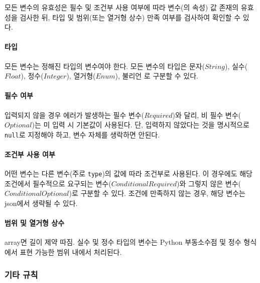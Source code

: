 \newcommand{\jsontable}[2]{
  \begin{table}[htbp]
    \centering
    \caption{grjson 구조에서 \texttt{#1} 클래스의 속성들}
    {\footnotesize
    \begin{tabularx}{\textwidth}{l c c c Y Y c}
      \toprule
      변수명 & 타입 & 필수 & 기본값 & 조건 & 범위/길이/선택지 & 단위 \\
      \midrule
      #2
      \bottomrule
    \end{tabularx}
   } 
  \end{table}
}

모든 변수의 유효성은 필수 및 조건부 사용 여부에 따라 변수(의 속성) 값 존재의 유효성을 검사한 뒤, 타입 및 범위(또는 열거형 상수) 만족 여부를 검사하여 확인할 수 있다.

\paragraph{타입} 모든 변수는 정해진 타입의 변수여야 한다. 모든 변수의 타입은 문자($String$), 실수($Float$), 정수($Integer$), 열거형($Enum$), 불리언 로 구분할 수 있다. 

\paragraph{필수 여부} 입력되지 않을 경우 에러가 발생하는 필수 변수($Required$)와 달리, 비 필수 변수($Optional$)는 미 입력 시 기본값이 사용된다. 단, 입력하지 않았다는 것을 명시적으로 \texttt{null}로 지정해야 하고, 변수 자체를 생락하면 안된다.

\paragraph{조건부 사용 여부} 어떤 변수는 다른 변수(주로 \texttt{type})의 값에 따라 조건부로 사용된다. 이 경우에도 해당 조건에서 필수적으로 요구되는 변수($Conditional Required$)와 그렇지 않은 변수($Conditional Optional$)로 구분할 수 있다. 조건에 만족하지 않는 경우, 해당 변수는 json에서 생략될 수 있다.

\paragraph{범위 및 열거형 상수} array면 길이 제약 따짐.
실수 및 정수 타입의 변수는 Python 부동소수점 및 정수 형식에서 표현 가능한 범위 내에서 처리된다.

\subsubsection{기타 규칙}

